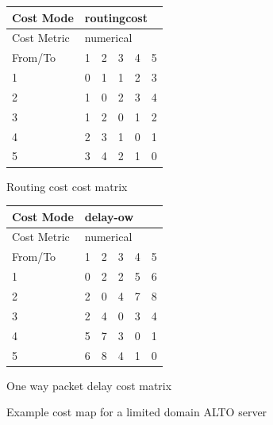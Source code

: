 \begin{figure}
    \centering
    \begin{subtable}{.4\linewidth}
        \centering
        \begin{tabular}{|l|l|l|l|l|l|}
        \hline
        Cost Mode   & \multicolumn{5}{|l|}{routingcost} \\ \hline
        Cost Metric & \multicolumn{5}{|l|}{numerical}   \\ \hline
        From/To     & 1    & 2     & 3   & 4   & 5      \\ \hline
        1           & 0    & 1     & 1   & 2   & 3      \\ \hline
        2           & 1    & 0     & 2   & 3   & 4      \\ \hline
        3           & 1    & 2     & 0   & 1   & 2      \\ \hline
        4           & 2    & 3     & 1   & 0   & 1      \\ \hline
        5           & 3    & 4     & 2   & 1   & 0      \\ \hline
        \end{tabular}
    \caption{Routing cost cost matrix}
    \end{subtable}
    \begin{subtable}{.4\linewidth}
        \centering
        \begin{tabular}{|l|l|l|l|l|l|}
        \hline
        Cost Mode   & \multicolumn{5}{|l|}{delay-ow}    \\ \hline
        Cost Metric & \multicolumn{5}{|l|}{numerical}   \\ \hline
        From/To     & 1    & 2     & 3   & 4   & 5      \\ \hline
        1           & 0    & 2     & 2   & 5   & 6      \\ \hline
        2           & 2    & 0     & 4   & 7   & 8      \\ \hline
        3           & 2    & 4     & 0   & 3   & 4      \\ \hline
        4           & 5    & 7     & 3   & 0   & 1      \\ \hline
        5           & 6    & 8     & 4   & 1   & 0      \\ \hline
        \end{tabular}
    \caption{One way packet delay cost matrix}
    \end{subtable}

    \caption{Example cost map for a limited domain ALTO server}
    \label{table:costmap-example-boundary}
\end{figure}

